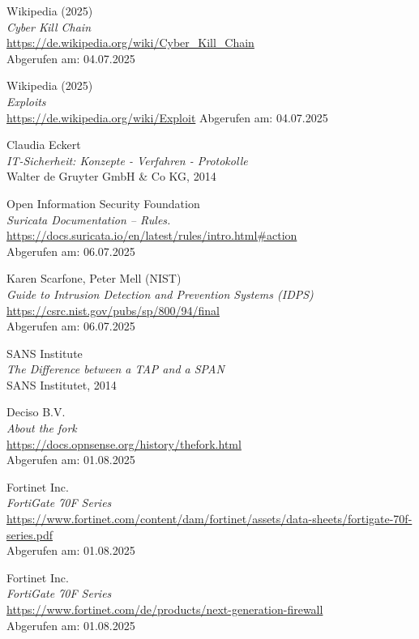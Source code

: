\documentclass[12pt]{scrreprt}
\begin{document}
\begin{thebibliography}{99}
Wikipedia (2025)\\
\emph{Cyber Kill Chain} \\
\url{https://de.wikipedia.org/wiki/Cyber_Kill_Chain}\\
Abgerufen am: 04.07.2025

Wikipedia (2025)\\
\emph{Exploits} \\
\url{https://de.wikipedia.org/wiki/Exploit}
Abgerufen am: 04.07.2025

Claudia Eckert\\
\emph{IT-Sicherheit: Konzepte - Verfahren - Protokolle} \\
Walter de Gruyter GmbH \& Co KG, 2014

Open Information Security Foundation\\
\emph{Suricata Documentation – Rules.} \\
\url{https://docs.suricata.io/en/latest/rules/intro.html#action}\\
Abgerufen am: 06.07.2025

Karen Scarfone, Peter Mell (NIST)\\
\emph{Guide to Intrusion Detection and Prevention Systems (IDPS)} \\
\url{https://csrc.nist.gov/pubs/sp/800/94/final}\\
Abgerufen am: 06.07.2025

SANS Institute\\
\emph{The Difference between a TAP and a SPAN} \\
SANS Institutet, 2014 

Deciso B.V.\\
\emph{About the fork} \\
\url{https://docs.opnsense.org/history/thefork.html}\\
Abgerufen am: 01.08.2025

Fortinet Inc.\\
\emph{FortiGate 70F Series} \\
\url{https://www.fortinet.com/content/dam/fortinet/assets/data-sheets/fortigate-70f-series.pdf}\\
Abgerufen am: 01.08.2025

Fortinet Inc.\\
\emph{FortiGate 70F Series} \\
\url{https://www.fortinet.com/de/products/next-generation-firewall}\\
Abgerufen am: 01.08.2025


\end{thebibliography}
\end{document}
